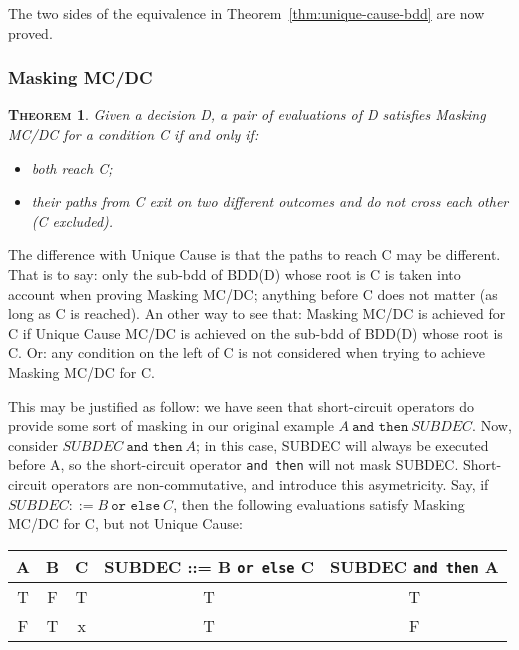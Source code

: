 \documentclass[a4paper,12pt,twoside]{article}
\newcommand{\andthen}{\texttt{and then}}
\newcommand{\orelse}{\texttt{or else}}
\newtheorem{theorem}{\textsc{Theorem}}
\begin{document}
The two sides of the equivalence in Theorem~\ref{thm:unique-cause-bdd}
are now proved.

\subsubsection{Masking MC/DC}

\begin{theorem}
  \label{thm:masking-bdd}
  Given a decision D, a pair of evaluations of D satisfies
  Masking MC/DC for a condition C if and only if:
  \begin{itemize}
  \item both reach C;
  \item their paths from C exit on two different outcomes and do not cross
  each other (C excluded).
  \end{itemize}
\end{theorem}

The difference with Unique Cause is that the paths to reach C may be
different. That is to say: only the sub-bdd of BDD(D) whose root is C
is taken into account when proving Masking MC/DC; anything before C
does not matter (as long as C is reached). An other way to see that:
Masking MC/DC is achieved for C if Unique Cause MC/DC is achieved on
the sub-bdd of BDD(D) whose root is C. Or: any condition on the left
of C is not considered when trying to achieve Masking MC/DC for C.

This may be justified as follow: we have seen that short-circuit operators
do provide some sort of masking in our original example
$A \ \andthen{} \ SUBDEC$. Now, consider $SUBDEC \ \andthen{} \ A$; in this
case, SUBDEC will always be executed before A, so the short-circuit operator
\andthen{} will not mask SUBDEC. Short-circuit operators are non-commutative,
and introduce this asymetricity. Say, if $SUBDEC ::= B \ \orelse \ C$, then
the following evaluations satisfy Masking MC/DC for C, but not Unique Cause:

\begin{center}
\begin{tabular}{|c|c|c||c||c|}
\hline
A & B & C & SUBDEC ::= B \orelse{} C & SUBDEC \andthen{} A \\ \hline
T & F & T & T                        & T \\ \hline
F & T & x & T                        & F \\ \hline
\end{tabular}
\end{center}
\end{document}
